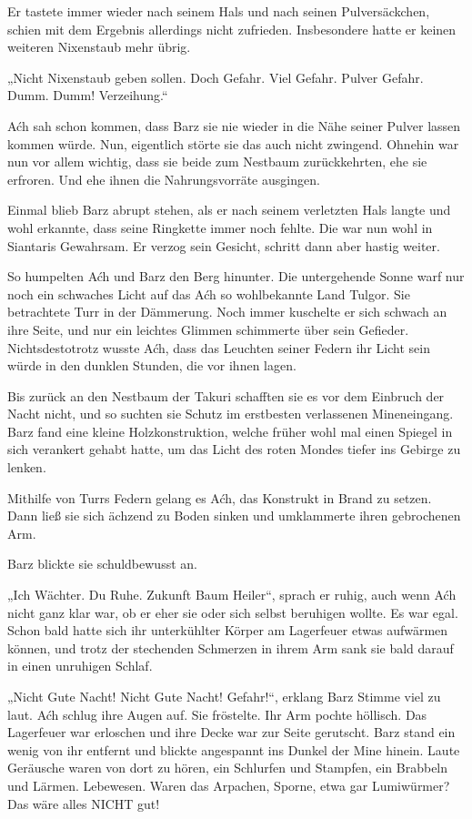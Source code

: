 Er tastete immer wieder nach seinem Hals und nach seinen Pulversäckchen, schien mit dem Ergebnis allerdings nicht zufrieden. Insbesondere hatte er keinen weiteren Nixenstaub mehr übrig.

„Nicht Nixenstaub geben sollen. Doch Gefahr. Viel Gefahr. Pulver Gefahr. Dumm. Dumm! Verzeihung.“

Aćh sah schon kommen, dass Barz sie nie wieder in die Nähe seiner Pulver lassen kommen würde. Nun, eigentlich störte sie das auch nicht zwingend. Ohnehin war nun vor allem wichtig, dass sie beide zum Nestbaum zurückkehrten, ehe sie erfroren. Und ehe ihnen die Nahrungsvorräte ausgingen.

Einmal blieb Barz abrupt stehen, als er nach seinem verletzten Hals langte und wohl erkannte, dass seine Ringkette immer noch fehlte. Die war nun wohl in Siantaris Gewahrsam. Er verzog sein Gesicht, schritt dann aber hastig weiter.

So humpelten Aćh und Barz den Berg hinunter. Die untergehende Sonne warf nur noch ein schwaches Licht auf das Aćh so wohlbekannte Land Tulgor. Sie betrachtete Turr in der Dämmerung. Noch immer kuschelte er sich schwach an ihre Seite, und nur ein leichtes Glimmen schimmerte über sein Gefieder. Nichtsdestotrotz wusste Aćh, dass das Leuchten seiner Federn ihr Licht sein würde in den dunklen Stunden, die vor ihnen lagen.

Bis zurück an den Nestbaum der Takuri schafften sie es vor dem Einbruch der Nacht nicht, und so suchten sie Schutz im erstbesten verlassenen Mineneingang. Barz fand eine kleine Holzkonstruktion, welche früher wohl mal einen Spiegel in sich verankert gehabt hatte, um das Licht des roten Mondes tiefer ins Gebirge zu lenken.

Mithilfe von Turrs Federn gelang es Aćh, das Konstrukt in Brand zu setzen. Dann ließ sie sich ächzend zu Boden sinken und umklammerte ihren gebrochenen Arm.

Barz blickte sie schuldbewusst an.

„Ich Wächter. Du Ruhe. Zukunft Baum Heiler“, sprach er ruhig, auch wenn Aćh nicht ganz klar war, ob er eher sie oder sich selbst beruhigen wollte. Es war egal. Schon bald hatte sich ihr unterkühlter Körper am Lagerfeuer etwas aufwärmen können, und trotz der stechenden Schmerzen in ihrem Arm sank sie bald darauf in einen unruhigen Schlaf.\bigskip







„Nicht Gute Nacht! Nicht Gute Nacht! Gefahr!“, erklang Barz Stimme viel zu laut. Aćh schlug ihre Augen auf. Sie fröstelte. Ihr Arm pochte höllisch. Das Lagerfeuer war erloschen und ihre Decke war zur Seite gerutscht. Barz stand ein wenig von ihr entfernt und blickte angespannt ins Dunkel der Mine hinein. Laute Geräusche waren von dort zu hören, ein Schlurfen und Stampfen, ein Brabbeln und Lärmen. Lebewesen. Waren das Arpachen, Sporne, etwa gar Lumiwürmer? Das wäre alles NICHT gut!

